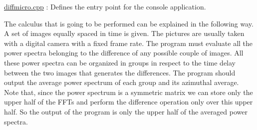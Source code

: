 \mbox{\hyperlink{diffmicro_8cpp}{diffmicro.\+cpp}} \+: Defines the entry point for the console application.

The calculus that is going to be performed can be explained in the following way. A set of images equally spaced in time is given. The pictures are usually taken with a digital camera with a fixed frame rate. The program must evaluate all the power spectra belonging to the difference of any possible couple of images. All these power spectra can be organized in groups in respect to the time delay between the two images that generates the differences. The program should output the average power spectrum of each group and its azimuthal average.~\newline
Note that, since the power spectrum is a symmetric matrix we can store only the upper half of the FFTs and perform the difference operation only over this upper half. So the output of the program is only the upper half of the averaged power spectra. 